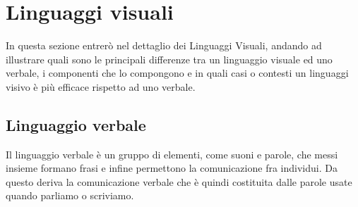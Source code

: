         \section{Linguaggi visuali}

            In questa sezione entrerò nel dettaglio dei Linguaggi Visuali, andando ad illustrare quali sono le principali differenze tra un linguaggio visuale ed uno verbale, i componenti che lo compongono e in quali casi o contesti un linguaggi visivo è più efficace rispetto ad uno verbale.

            \subsection{Linguaggio verbale}
                Il linguaggio verbale è un gruppo di elementi, come suoni e parole, che messi insieme formano frasi e infine permettono la comunicazione fra individui. Da questo deriva la comunicazione verbale che è quindi costituita dalle parole usate quando parliamo o scriviamo.

